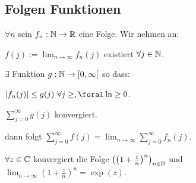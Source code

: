 \subsection{Folgen Funktionen}
$\forall n$ sein $f_n : \mathbb{N} \to \mathbb{R}$ eine Folge. Wir nehmen an:
\begin{compactenum}
    \item $f(j) := \lim_{n \to \infty} f_n(j)$ existiert $\forall j \in \mathbb{N}$.
    \item $\exists$ Funktion $g: \mathbb{N} \to [0, \infty[$ so dass:
        \begin{compactenum}[{2}.1]
            \item $\left| f_n(j) \right| \le g(j) \ \forall j \ge, \foral\ln \ge 0 $.
            \item $\sum_{j=0}^{\infty} g(j)$ konvergiert.
        \end{compactenum}
\end{compactenum}
dann folgt $\sum_{j=0}^{\infty} f(j) = \lim_{n \to \infty} \sum_{j=0}^{\infty} f_n(j)$.
\begin{compactitem}
\item $\forall z \in \mathbb{C}$ konvergiert die Folge $\left( \left( 1 + \frac{z}{n} \right)^n  \right)_{n \in \mathbb{N}} $ und $\lim_{n \to \infty} \left( 1 + \frac{z}{n} \right)^n = \exp(z)$.
\end{compactitem}


